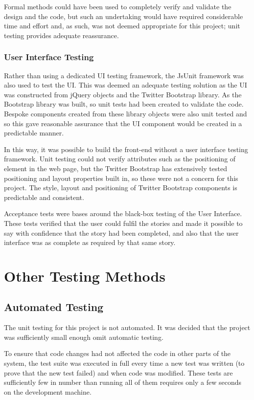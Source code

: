 Formal methods could have been used to completely verify and validate the design and the code, but such an undertaking would have required considerable time and effort and, as such, was not deemed appropriate for this project; unit testing provides adequate reassurance.

\subsubsection{User Interface Testing}
Rather than using a dedicated UI testing framework, the JsUnit framework was also used to test the UI. This was deemed an adequate testing solution as the UI was constructed from jQuery objects and the Twitter Bootstrap library. As the Bootstrap library was built, so unit tests had been created to validate the code. Bespoke components created from these library objects were also unit tested and so this gave reasonable assurance that the UI component would be created in a predictable manner.

In this way, it was possible to build the front-end without a user interface testing framework. Unit testing could not verify attributes such as the positioning of element in the web page, but the Twitter Bootstrap has extensively tested positioning and layout properties built in, so these were not a concern for this project. The style, layout and positioning of Twitter Bootstrap components is predictable and consistent.

Acceptance tests were bases around the black-box testing of the User Interface. These tests verified that the user could fulfil the stories and made it possible to say with confidence that the story had been completed, and also that the user interface was as complete as required by that same story.

\section{Other Testing Methods}

\subsection{Automated Testing}
The unit testing for this project is not automated. It was decided that the project was sufficiently small enough omit automatic testing.

To ensure that code changes had not affected the code in other parts of the system, the test suite was executed in full every time a new test was written (to prove that the new test failed) and when code was modified. These tests are sufficiently few in number than running all of them requires only a few seconds on the development machine.

